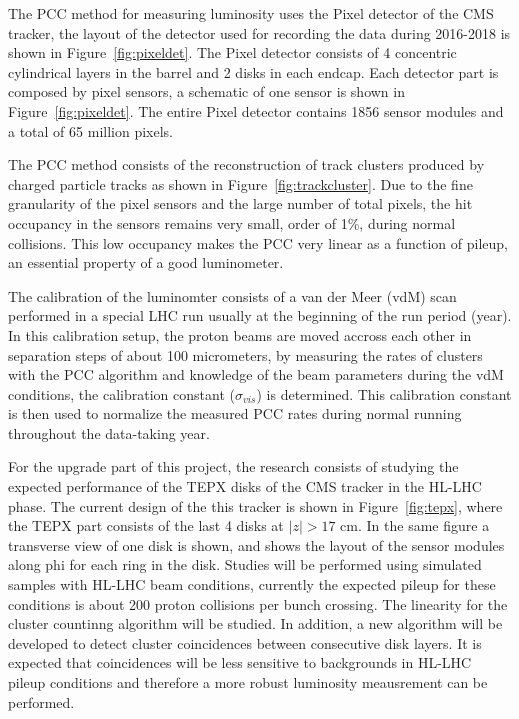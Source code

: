 \documentclass[final,12p]{article}
\begin{document}
The PCC method for measuring luminosity uses the Pixel detector of the CMS tracker, the layout of the  detector used for recording the data during 2016-2018 is shown in Figure~\ref{fig:pixeldet}.
The Pixel detector consists of 4 concentric cylindrical layers in the barrel and 2 disks in each endcap.
Each detector part is composed by pixel sensors, a schematic of one sensor is shown in Figure~\ref{fig:pixeldet}.
The entire Pixel detector contains 1856 sensor modules and a total of 65 million pixels.

The PCC method consists of the reconstruction of track clusters produced by charged particle tracks as shown in Figure~\ref{fig:trackcluster}.
Due to the fine granularity of the pixel sensors and the large number of total pixels, the hit occupancy in the sensors remains very small, order of 1\%, during normal collisions.
This low occupancy makes the PCC  very linear as a function of pileup, an essential property of a good luminometer.

The calibration of the luminomter consists of a van der Meer (vdM) scan performed in a special LHC run usually at the beginning of the run period (year).
In this calibration setup, the proton beams are moved accross each other in separation steps of about 100 micrometers, by measuring the rates of clusters with the PCC algorithm and knowledge of the beam parameters during the vdM conditions, the calibration constant ($\sigma_{vis}$) is determined.
This calibration constant is then used to normalize the measured PCC rates during normal running throughout the data-taking year.

For the upgrade part of this project, the research consists of studying the expected performance of the TEPX disks of the CMS tracker in the HL-LHC phase.
The current design of the this tracker is shown in Figure~\ref{fig:tepx}, where the TEPX part consists of the last 4 disks at $|z|>17$ cm.
In the same figure a transverse view of one disk is shown, and shows the layout of the sensor modules along phi for each ring in the disk.
Studies will be performed using simulated samples with HL-LHC beam conditions, currently the expected pileup for these conditions is about 200 proton collisions per bunch crossing.
The linearity for the cluster countinng algorithm will be studied.
In addition, a new algorithm will be developed to detect cluster coincidences between consecutive disk layers.
It is expected that coincidences will be less sensitive to backgrounds in HL-LHC pileup conditions and therefore a more robust luminosity meausrement can be performed.
\end{document}
